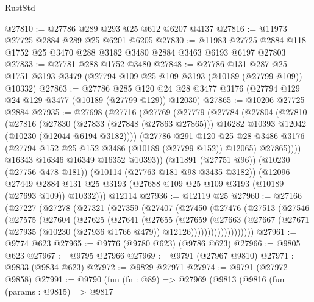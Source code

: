 \begin{lexlean}{RustStd}
\begin{coremodule}
@27810 := @27786 @289 @293 @25 @612 @6207 @4137
@27816 := @11973 @27725 @2884 @289 @25 @6201 @6205
@27830 := @11983 @27725 @2884 @118 @1752 @25 @3470 @288 @3182 @3480 @2884 @3463 @6193 @6197 @27803
@27833 := @27781 @288 @1752 @3480
@27848 := @27786
    @131
    @287
    @25
    @1751
    @3193
    @3479
    (@27794 @109 @25 @109 @3193 (@10189 (@27799 @109)) @10332)
@27863 := @27786
    @285
    @120
    @24
    @28
    @3477
    @3176
    (@27794 @129 @24 @129 @3477 (@10189 (@27799 @129)) @12030)
@27865 := @10206 @27725 @2884
@27935 := @27698
    (@27716
      (@27769
        (@27779
          (@27784
            (@27804
              (@27810
                (@27816
                  (@27830
                    (@27833 (@27848 (@27863 @27865)))
                    @16282
                    @10393
                    @12042
                    (@10230 (@12044 @6194 @3182))))
                (@27786
                  @291
                  @120
                  @25
                  @28
                  @3486
                  @3176
                  (@27794 @152 @25 @152 @3486 (@10189 (@27799 @152)) @12065)
                  @27865))))
          @16343
          @16346
          @16349
          @16352
          @10393))
      (@11891 (@27751 @96))
      (@10230 (@27756 @478 @181))
      (@10114 (@27763 @181 @98 @3435 @3182))
      (@12096
        @27449
        @2884
        @131
        @25
        @3193
        (@27688 @109 @25 @109 @3193 (@10189 (@27693 @109)) @10332)))
    @12114
@27936 := @12119 @25
@27960 := @27166
    (@27227
      (@27278
        (@27321
          (@27359
            (@27407
              (@27450
                (@27476
                  (@27513
                    (@27546
                      (@27575
                        (@27604
                          (@27625
                            (@27641
                              (@27655
                                (@27659
                                  (@27663
                                    (@27667
                                      (@27671
                                        (@27935
                                          (@10230 (@27936 @1766 @479))
                                          @12126)))))))))))))))))))
@27961 := @9774 @623
@27965 := @9776 (@9780 @623) (@9786 @623)
@27966 := @9805 @623
@27967 := @9795 @27966
@27969 := @9791 (@27967 @9810)
@27971 := @9833 (@9834 @623)
@27972 := @9829 @27971
@27974 := @9791 (@27972 @9858)
@27991 := @9790
    (fun (fn : @89) =>
    @27969
      (@9813
        (@9816
          (fun (params : @9815) =>
          @9817

\end{coremodule}
\end{lexlean}
